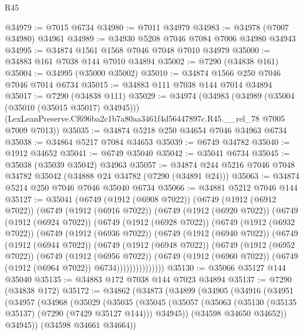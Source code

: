 \begin{lexlean}{R45}
\begin{coremodule}
{@34979 := @7015 @6734
@34980 := @7011 @34979
@34983 := @34978 (@7007 @34980) @34961
@34989 := @34930 @5208 @7046 @7084 @7006 @34980 @34943
@34995 := @34874 @1561 @1568 @7046 @7048 @7010 @34979
@35000 := @34883 @161 @7038 @144 @7010 @34894
@35002 := @7290 (@34838 @161)
@35004 := @34995 (@35000 @35002)
@35010 := @34874 @1566 @250 @7046 @7046 @7014 @6734
@35015 := @34883 @111 @7038 @144 @7014 @34894
@35017 := @7290 (@34838 @111)
@35029 := @34974
    (@34983
      (@34989 (@35004 (@35010 (@35015 @35017) @34945)))
      (LexLeanPreserve.Cf696ba2c1b7a80aa3461f4d56447897c.R45.__rel_78 @7005 @7009 @7013))
@35035 := @34874 @5218 @250 @34654 @7046 @34963 @6734
@35038 := @34864 @5217 @7084 @34653
@35039 := @6749 @34782
@35040 := @1912 @34652
@35041 := @6749 @35040
@35042 := @35041 @6734
@35045 := @35038 (@35039 @35042) @34963
@35057 := @34874 @244 @5216 @7046 @7048 @34782 @35042 (@34888 @24 @34782 (@7290 (@34891 @24)))
@35063 := @34874 @5214 @250 @7046 @7046 @35040 @6734
@35066 := @34881 @5212 @7046 @144
@35127 := @35041
    (@6749
      (@1912 (@6908 @7022))
      (@6749
        (@1912 (@6912 @7022))
        (@6749
          (@1912 (@6916 @7022))
          (@6749
            (@1912 (@6920 @7022))
            (@6749
              (@1912 (@6924 @7022))
              (@6749
                (@1912 (@6928 @7022))
                (@6749
                  (@1912 (@6932 @7022))
                  (@6749
                    (@1912 (@6936 @7022))
                    (@6749
                      (@1912 (@6940 @7022))
                      (@6749
                        (@1912 (@6944 @7022))
                        (@6749
                          (@1912 (@6948 @7022))
                          (@6749
                            (@1912 (@6952 @7022))
                            (@6749
                              (@1912 (@6956 @7022))
                              (@6749
                                (@1912 (@6960 @7022))
                                (@6749 (@1912 (@6964 @7022)) @6734)))))))))))))))
@35130 := @35066 @35127 @144 @35040
@35135 := @34883 @172 @7038 @144 @7023 @34894
@35137 := @7290 (@34838 @172)
@35172 := @34862
    (@34873
      (@34899
        (@34905
          (@34916
            (@34951
              (@34957
                (@34968
                  (@35029
                    (@35035
                      (@35045
                        (@35057
                          (@35063 (@35130 (@35135 @35137) (@7290 (@7429 @35127 @144))) @34945))
                        (@34598 @34650 @34652))
                      @34945))
                  (@34598 @34661 @34664))
}
\end{coremodule}
\end{lexlean}
